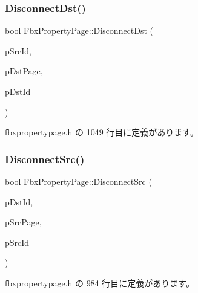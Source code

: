 \subsubsection{\texorpdfstring{Disconnect\+Dst()}{DisconnectDst()}}
{\footnotesize\ttfamily bool Fbx\+Property\+Page\+::\+Disconnect\+Dst (\begin{DoxyParamCaption}\item[{\hyperlink{fbxtypes_8h_a088fa96de3b0b3ea69f0f6afef525dfb}{Fbx\+Int}}]{p\+Src\+Id,  }\item[{\hyperlink{class_fbx_property_page}{Fbx\+Property\+Page} $\ast$}]{p\+Dst\+Page,  }\item[{\hyperlink{fbxtypes_8h_a088fa96de3b0b3ea69f0f6afef525dfb}{Fbx\+Int}}]{p\+Dst\+Id }\end{DoxyParamCaption})\hspace{0.3cm}{\ttfamily [inline]}}



 fbxpropertypage.\+h の 1049 行目に定義があります。

\mbox{\label{class_fbx_property_page_a6055899e9dc5c8ef90364aef784bc7e2}} 
\subsubsection{\texorpdfstring{Disconnect\+Src()}{DisconnectSrc()}}
{\footnotesize\ttfamily bool Fbx\+Property\+Page\+::\+Disconnect\+Src (\begin{DoxyParamCaption}\item[{\hyperlink{fbxtypes_8h_a088fa96de3b0b3ea69f0f6afef525dfb}{Fbx\+Int}}]{p\+Dst\+Id,  }\item[{\hyperlink{class_fbx_property_page}{Fbx\+Property\+Page} $\ast$}]{p\+Src\+Page,  }\item[{\hyperlink{fbxtypes_8h_a088fa96de3b0b3ea69f0f6afef525dfb}{Fbx\+Int}}]{p\+Src\+Id }\end{DoxyParamCaption})\hspace{0.3cm}{\ttfamily [inline]}}



 fbxpropertypage.\+h の 984 行目に定義があります。

\mbox{\label{class_fbx_property_page_a955e3d64e6ee00c7d82133aff0c5c0cb}} 
